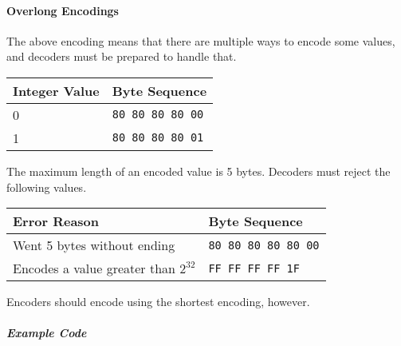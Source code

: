 \documentclass[]{article}
\begin{document}
\paragraph{Overlong Encodings}

The above encoding means that there are multiple ways to encode some values, and decoders must be
prepared to handle that.

\begin{longtable}[]{@{}p{1in}p{5in}@{}}
\toprule
Integer Value & Byte Sequence \\
\midrule
\endhead
         0 & \texttt{80 80 80 80 00} \\
         1 & \texttt{80 80 80 80 01} \\
\bottomrule
\end{longtable}

The maximum length of an encoded value is 5 bytes. Decoders must reject the following values.

\begin{longtable}[]{@{}p{2in}p{4in}@{}}
\toprule
Error Reason & Byte Sequence \\
\midrule
\endhead
         Went 5 bytes without ending & \texttt{80 80 80 80 80 00} \\
         Encodes a value greater than $2^{32}$ & \texttt{FF FF FF FF 1F} \\
\bottomrule
\end{longtable}

Encoders should encode using the shortest encoding, however.

\hypertarget{example-code}{\subparagraph{Example Code}\label{example-code}}
\end{document}
